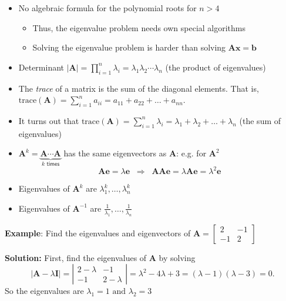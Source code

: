 \begin{itemize}
\item No algebraic formula for the polynomial roots for $n > 4$ 
\begin{itemize}
\item Thus, the eigenvalue problem needs own special algorithms
\item Solving the eigenvalue problem is harder than solving $\mathbf{Ax} = \mathbf{b}$
\end{itemize}
\item Determinant
 $\vert\mathbf{A}\vert = \prod_{i = 1}^n \lambda_i =  \lambda_1\lambda_2\cdots\lambda_n$ (the product of eigenvalues)
\item The {\em trace} of a matrix is the sum of the diagonal elements.  That is, \\ $\mathrm{trace}(\mathbf{A}) = \sum_{i=1}^n a_{ii} = a_{11}+a_{22}+\ldots+a_{nn}$.  
\item It turns out that $\mathrm{trace}(\mathbf{A}) = \sum_{i = 1}^n \lambda_i
            = \lambda_1+\lambda_2+\ldots+\lambda_n$ (the sum of eigenvalues)
 \item $\mathbf{A}^k= \underbrace{\mathbf{A}\cdots\mathbf{A}}_{k\textsf{  times}}$ has the same eigenvectors as $\mathbf{A}$: 
 e.g. for $\mathbf{A}^2$\vspace*{-3mm}
 \[
 \mathbf{A}\mathbf{e} = \lambda\mathbf{e} \;\; {\Rightarrow}\;\;\mathbf{A}\mathbf{A}\mathbf{e} = \lambda\mathbf{A}\mathbf{e} = \lambda^2\mathbf{e}
 \]\vspace*{-3mm}
\item Eigenvalues of $\mathbf{A}^k $ are $\lambda_1^k,\ldots, \lambda_n^k$
\item Eigenvalues of $\mathbf{A}^{-1}$ are 
 $\frac{1}{\lambda_1},\ldots,\frac{1}{\lambda_n}$
\end{itemize}
 
{\bf Example}: Find the eigenvalues and eigenvectors of $\mathbf{A} = \left[\begin{array}{rr}2 & -1\\-1 & 2\end{array}\right]$

{\bf Solution:} First, find the eigenvalues of $\mathbf A$ by solving 
\[
\vert\mathbf{A}-\lambda\mathbf{I}\vert=
\left\vert\begin{array}{rr}2-\lambda & -1\\-1 & 2-\lambda \end{array}\right\vert = 
\lambda^2 - 4\lambda +3 = (\lambda - 1)(\lambda -3) = 0.
\]
So the eigenvalues are $ \lambda_1 = 1 \mbox{ and } \lambda_2 = 3$

